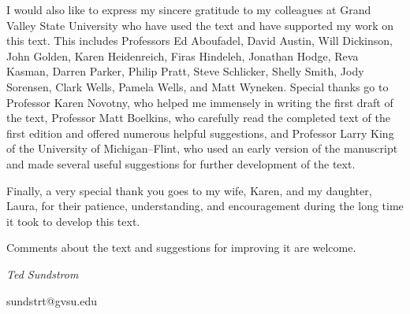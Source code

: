 %
\vskip9pt
I would also like to express my sincere gratitude to my colleagues at Grand Valley State University who have used the text and have supported my work on this text.  This includes Professors 
Ed Aboufadel, 
David Austin, 
Will Dickinson,
John Golden, 
Karen Heidenreich, 
Firas Hindeleh, 
Jonathan Hodge, 
Reva Kasman, 
Darren Parker, 
Philip Pratt, 
Steve Schlicker, 
Shelly Smith, 
Jody Sorensen, 
Clark Wells,  
Pamela Wells, and 
Matt Wyneken.  Special thanks go to Professor Karen Novotny, who helped me immensely in writing the first draft of the text, Professor Matt Boelkins, who carefully read the completed text of the first edition and offered numerous helpful suggestions, and Professor Larry King of the University of Michigan--Flint, who used an early version of the manuscript and made several useful suggestions for further development of the text.  

Finally, a very special thank you goes to my wife, Karen, and my daughter, Laura, for their patience, understanding, and encouragement during the long time it took to develop this text.

Comments about the text and suggestions for improving it are welcome.

\begin{flushright}
\emph{Ted Sundstrom}

sundstrt@gvsu.edu
\end{flushright}
\newpage
\thispagestyle{empty}

\endinput

